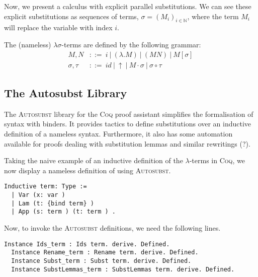 Now, we present a calculus with explicit parallel substitutions.
We can see these explicit substitutions as sequences of terms, $\sigma = (M_i)_{i \in \mathbb{N}}$, where the term $M_i$ will replace the variable with index $i$.

\begin{definition}
  The (nameless) $\lambda \sigma$-terms are defined by the following grammar:  
  \begin{align*}
    M, N         &::= \ i \ | \ (\lambda . M) \ | \ (M N) \ | \ M[\sigma] \\
    \sigma, \tau &::= \ id \ | \ \uparrow \ | \ M \cdot \sigma \ | \ \sigma \circ \tau
  \end{align*}
\end{definition}

\begin{definition}

\end{definition}

\subsection{The Autosubst Library}
\cite{AutosubstSchafer}

The \textsc{Autosubst} library for the \textsc{Coq} proof assistant simplifies the formalisation of syntax with binders.
It provides tactics to define substitutions over an inductive definition of a nameless syntax.
Furthermore, it also has some automation available for proofs dealing with substitution lemmas and similar rewritings (?).

Taking the naive example of an inductive definition of the $\lambda$-terms in \textsc{Coq}, we now display a nameless definition of using \textsc{Autosubst}.

\begin{lstlisting}[language=Coq]
  Inductive term: Type :=
  | Var (x: var )
  | Lam (t: {bind term} )
  | App (s: term ) (t: term ) .
\end{lstlisting}

Now, to invoke the \textsc{Autosubst} definitions, we need the following lines.

\begin{lstlisting}[language=Coq]
  Instance Ids_term : Ids term. derive. Defined.
  Instance Rename_term : Rename term. derive. Defined.
  Instance Subst_term : Subst term. derive. Defined.
  Instance SubstLemmas_term : SubstLemmas term. derive. Defined.
\end{lstlisting}


